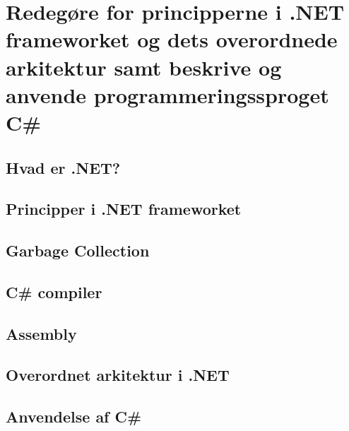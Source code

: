 \section{Redegøre for principperne i .NET frameworket og dets overordnede arkitektur samt beskrive og anvende programmeringssproget C\#}\label{sec:spm1}

\subsection{Hvad er .NET?}



\subsection{Principper i .NET frameworket}


\subsection{Garbage Collection}

\subsection{C\# compiler}

\subsection{Assembly}

\subsection{Overordnet arkitektur i .NET}

\subsection{Anvendelse af C\#}
